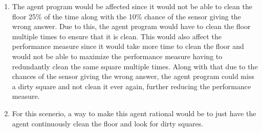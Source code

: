 \documentclass{article}
\begin{document}
\begin{enumerate}[label= (\alph*)]
    \item The agent program would be affected since it would not be able to clean the floor 25\% of the time along with the 10\% chance of the sensor giving the wrong answer. Due to this, the agent program would have to clean the floor multiple times to ensure that it is clean. This would also affect the performance measure since it would take more time to clean the floor and would not be able to maximize the performance measure having to redundantly clean the same square multiple times. Along with that due to the chances of the sensor giving the wrong answer, the agent program could miss a dirty square and not clean it ever again, further reducing the performance measure.
    \item For this scenerio, a way to make this agent rational would be to just have the agent continuously clean the floor and look for dirty squares.
\end{enumerate}
\end{document}

